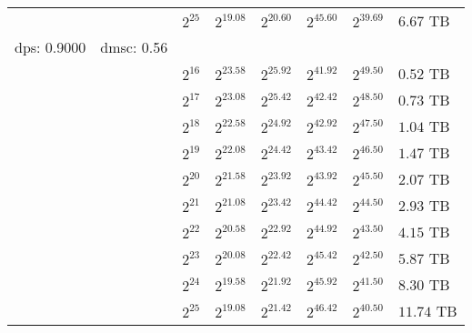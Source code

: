 \begin{tabular}{llllllll}
 &  & $2^{25}$ & $2^{19.08}$ & $2^{20.60}$ & $2^{45.60}$ & $2^{39.69}$ & $6.67$ TB \\
dps: 0.9000 & dmsc: 0.56 &  &  &  &  &  &  \\
 &  & $2^{16}$ & $2^{23.58}$ & $2^{25.92}$ & $2^{41.92}$ & $2^{49.50}$ & $0.52$ TB \\
 &  & $2^{17}$ & $2^{23.08}$ & $2^{25.42}$ & $2^{42.42}$ & $2^{48.50}$ & $0.73$ TB \\
 &  & $2^{18}$ & $2^{22.58}$ & $2^{24.92}$ & $2^{42.92}$ & $2^{47.50}$ & $1.04$ TB \\
 &  & $2^{19}$ & $2^{22.08}$ & $2^{24.42}$ & $2^{43.42}$ & $2^{46.50}$ & $1.47$ TB \\
 &  & $2^{20}$ & $2^{21.58}$ & $2^{23.92}$ & $2^{43.92}$ & $2^{45.50}$ & $2.07$ TB \\
 &  & $2^{21}$ & $2^{21.08}$ & $2^{23.42}$ & $2^{44.42}$ & $2^{44.50}$ & $2.93$ TB \\
 &  & $2^{22}$ & $2^{20.58}$ & $2^{22.92}$ & $2^{44.92}$ & $2^{43.50}$ & $4.15$ TB \\
 &  & $2^{23}$ & $2^{20.08}$ & $2^{22.42}$ & $2^{45.42}$ & $2^{42.50}$ & $5.87$ TB \\
 &  & $2^{24}$ & $2^{19.58}$ & $2^{21.92}$ & $2^{45.92}$ & $2^{41.50}$ & $8.30$ TB \\
 &  & $2^{25}$ & $2^{19.08}$ & $2^{21.42}$ & $2^{46.42}$ & $2^{40.50}$ & $11.74$ TB \\
\end{tabular}